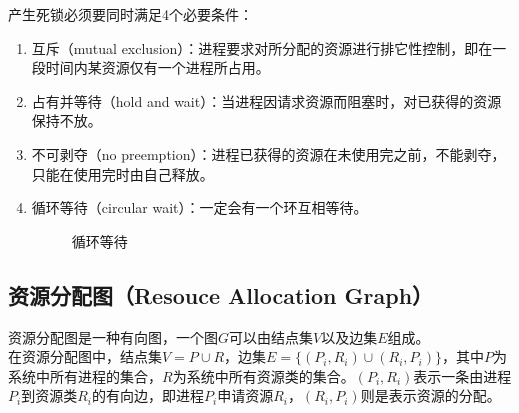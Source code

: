 产生死锁必须要同时满足4个必要条件：

\begin{enumerate}
    \item 互斥（mutual exclusion）：进程要求对所分配的资源进行排它性控制，即在一段时间内某资源仅有一个进程所占用。

    \item 占有并等待（hold and wait）：当进程因请求资源而阻塞时，对已获得的资源保持不放。

    \item 不可剥夺（no preemption）：进程已获得的资源在未使用完之前，不能剥夺，只能在使用完时由自己释放。

    \item 循环等待（circular wait）：一定会有一个环互相等待。

          \begin{figure}[H]
              \centering
              \caption{循环等待}
          \end{figure}
\end{enumerate}

\vspace{0.5cm}

\subsection{资源分配图（Resouce Allocation Graph）}

资源分配图是一种有向图，一个图$ G $可以由结点集$ V $以及边集$ E $组成。\\

在资源分配图中，结点集$ V = P \cup R $，边集$ E = \{(P_i, R_i) \cup (R_i, P_i)\} $，其中$ P $为系统中所有进程的集合，$ R $为系统中所有资源类的集合。$ (P_i, R_i) $表示一条由进程$ P_i $到资源类$ R_i $的有向边，即进程$ P_i $申请资源$ R_i $，$ (R_i, P_i) $则是表示资源的分配。


